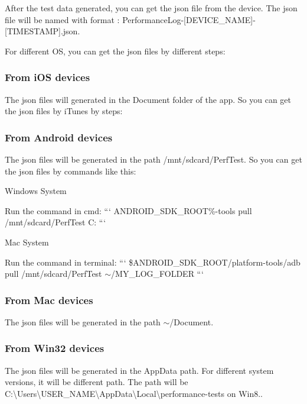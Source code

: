 After the test data generated, you can get the json file from the device. The json file will be named with format \+: {\ttfamily Performance\+Log-\/\mbox{[}D\+E\+V\+I\+C\+E\+\_\+\+N\+A\+ME\mbox{]}-\/\mbox{[}T\+I\+M\+E\+S\+T\+A\+MP\mbox{]}.json}.

For different OS, you can get the json files by different steps\+:

\subsubsection*{From i\+OS devices}

The json files will generated in the {\ttfamily Document} folder of the app. So you can get the json files by i\+Tunes by steps\+: 

\subsubsection*{From Android devices}

The json files will be generated in the path {\ttfamily /mnt/sdcard/\+Perf\+Test}. So you can get the json files by commands like this\+:


\begin{DoxyItemize}
\item Windows System

Run the command in cmd\+: ``` A\+N\+D\+R\+O\+I\+D\+\_\+\+S\+D\+K\+\_\+\+R\+O\+OT\%-\/tools pull /mnt/sdcard/\+Perf\+Test C\+: ```
\item Mac System

Run the command in terminal\+: ``` \$\+A\+N\+D\+R\+O\+I\+D\+\_\+\+S\+D\+K\+\_\+\+R\+O\+OT/platform-\/tools/adb pull /mnt/sdcard/\+Perf\+Test $\sim$/\+M\+Y\+\_\+\+L\+O\+G\+\_\+\+F\+O\+L\+D\+ER ```
\end{DoxyItemize}

\subsubsection*{From Mac devices}

The json files will be generated in the path {\ttfamily $\sim$/\+Document}.

\subsubsection*{From Win32 devices}

The json files will be generated in the App\+Data path. For different system versions, it will be different path. The path will be {\ttfamily C\+:\textbackslash{}Users\textbackslash{}U\+S\+E\+R\+\_\+\+N\+A\+ME\textbackslash{}App\+Data\textbackslash{}Local\textbackslash{}performance-\/tests} on Win8..

